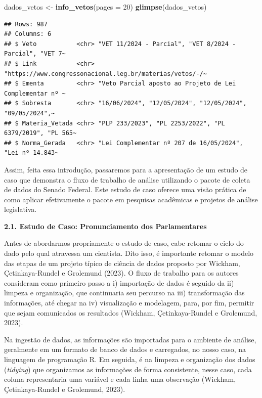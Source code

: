 \documentclass{article}
\newenvironment{Shaded}{\begin{snugshade}}{\end{snugshade}}
\newcommand{\AttributeTok}[1]{\textcolor[rgb]{0.13,0.29,0.53}{#1}}
\newcommand{\DecValTok}[1]{\textcolor[rgb]{0.00,0.00,0.81}{#1}}
\newcommand{\FunctionTok}[1]{\textcolor[rgb]{0.13,0.29,0.53}{\textbf{#1}}}
\newcommand{\NormalTok}[1]{#1}
\newcommand{\OtherTok}[1]{\textcolor[rgb]{0.56,0.35,0.01}{#1}}
\begin{document}
\begin{Shaded}
\begin{Highlighting}[]
\NormalTok{dados\_vetos }\OtherTok{\textless{}{-}} \FunctionTok{info\_vetos}\NormalTok{(}\AttributeTok{pages =} \DecValTok{20}\NormalTok{)}
\FunctionTok{glimpse}\NormalTok{(dados\_vetos)}
\end{Highlighting}
\end{Shaded}

\begin{verbatim}
## Rows: 987
## Columns: 6
## $ Veto           <chr> "VET 11/2024 - Parcial", "VET 8/2024 - Parcial", "VET 7~
## $ Link           <chr> "https://www.congressonacional.leg.br/materias/vetos/-/~
## $ Ementa         <chr> "Veto Parcial aposto ao Projeto de Lei Complementar nº ~
## $ Sobresta       <chr> "16/06/2024", "12/05/2024", "12/05/2024", "09/05/2024",~
## $ Materia_Vetada <chr> "PLP 233/2023", "PL 2253/2022", "PL 6379/2019", "PL 565~
## $ Norma_Gerada   <chr> "Lei Complementar nº 207 de 16/05/2024", "Lei nº 14.843~
\end{verbatim}

Assim, feita essa introdução, passaremos para a apresentação de um
estudo de caso que demonstra o fluxo de trabalho de análise utilizando o
pacote de coleta de dados do Senado Federal. Este estudo de caso oferece
uma visão prática de como aplicar efetivamente o pacote em pesquisas
acadêmicas e projetos de análise legislativa.

\textbf{2.1. Estudo de Caso: Pronunciamento dos Parlamentares}

Antes de abordarmos propriamente o estudo de caso, cabe retomar o ciclo
do dado pelo qual atravessa um cientista. Dito isso, é importante
retomar o modelo das etapas de um projeto típico de ciência de dados
proposto por Wickham, Çetinkaya-Rundel e Grolemund (2023). O fluxo de
trabalho para os autores consideram como primeiro passo a i) importação
de dados é seguido da ii) limpeza e organização, que continuaria seu
percurso na iii) transformação das informações, até chegar na iv)
visualização e modelagem, para, por fim, permitir que sejam comunicados
os resultados (Wickham, Çetinkaya-Rundel e Grolemund, 2023).

Na ingestão de dados, as informações são importadas para o ambiente de
análise, geralmente em um formato de banco de dados e carregados, no
nosso caso, na linguagem de programação R. Em seguida, é na limpeza e
organização dos dados (\emph{tidying}) que organizamos as informações de
forma consistente, nesse caso, cada coluna representaria uma variável e
cada linha uma observação (Wickham, Çetinkaya-Rundel e Grolemund, 2023).
\end{document}

